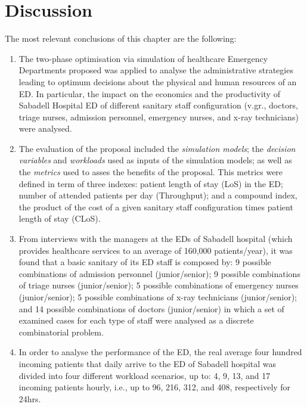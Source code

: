 \clearpage{}


\section{Discussion}

The most relevant conclusions of this chapter are the following:
\begin{enumerate}
\item The two-phase optimisation via simulation of healthcare Emergency
Departments proposed was applied to analyse the administrative strategies
leading to optimum decisions about the physical and human resources
of an ED. In particular, the impact on the economics and the productivity
of Sabadell Hospital ED of different sanitary staff configuration
(v.gr., doctors, triage nurses, admission personnel, emergency nurses,
and x-ray technicians) were analysed.\\

\item The evaluation of the proposal included the \textit{simulation models};
the \textit{decision variables} and\textit{ workloads} used as inputs
of the simulation models; as well as the \textit{metrics} used to
asses the benefits of the proposal. This metrics were defined in term
of three indexes: patient length of stay (LoS) in the ED; number of
attended patients per day (Throughput); and a compound index, the
product of the cost of a given sanitary staff configuration times
patient length of stay (CLoS).\\

\item From interviews with the managers at the EDs of Sabadell hospital
(which provides healthcare services to an average of 160,000 patients/year),
it was found that a basic sanitary of its ED staff is composed by:
9 possible combinations of admission personnel (junior/senior); 9
possible combinations of triage nurses (junior/senior); 5 possible
combinations of emergency nurses (junior/senior); 5 possible combinations
of x-ray technicians (junior/senior); and 14 possible combinations
of doctors (junior/senior) in which a set of examined cases for each
type of staff were analysed as a discrete combinatorial problem.\\

\item In order to analyse the performance of the ED, the real average four
hundred incoming patients that daily arrive to the ED of Sabadell
hospital was divided into four different workload scenarios, up to:
4, 9, 13, and 17 incoming patients hourly, i.e., up to 96, 216, 312,
and 408, respectively for 24hrs.\\


\end{enumerate}
